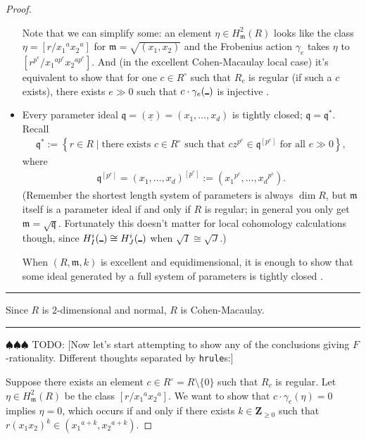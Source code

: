 \documentclass{amsart}
\theoremstyle{definition}
\def\ux{\underline{x}}
\def\Arg{\rule{1ex}{1pt}}
\def\fm{\mathfrak{m}}
\def\fq{\mathfrak{q}}
\newcommand{\ZZ}{\mathbf Z}
\newcommand{\todo}[1]{{\color{teal} \sf $\spadesuit\spadesuit\spadesuit$ TODO: [#1]}}
\begin{document}
\begin{proof}
\begin{itemize}
Note that we can simplify some: an element $\eta\in H_{\fm}^{2}(R)$ looks like the class $\eta=[r/{x_{1}}^{a}{x_{2}}^{a}]$ for $\fm=\sqrt{(x_{1},x_{2})}$ and the Frobenius action $\gamma_{e}$ takes $\eta$ to $[r^{p^{e}}/{x_{1}}^{ap^{e}}{x_{2}}^{ap^{e}}]$. And (in the excellent Cohen-Macaulay local case) it's equivalent to show that for one $c\in R^{\circ}$ such that $R_{c}$ is regular (if such a $c$ exists), there exists $e\gg0$ such that $c\cdot\gamma_{e}(\Arg)$ is injective \cite[Thm.\ ~7.9]{MP21}.
\item Every parameter ideal $\fq=(\ux)=(x_{1},\ldots,x_{d})$ is tightly closed; $\fq=\fq^{*}$. Recall 
\begin{align*}
\fq^{*}:=\left\{r\in R\mid\text{there exists }c\in R^{\circ}\text{ such that }cz^{p^{e}}\in\fq^{[p^{e}]}\text{ for all }e\gg0\right\},
\end{align*}
where
\begin{align*}
\fq^{[p^{e}]}=(x_{1},\ldots,x_{d})^{[p^{e}]}:=({x_{1}}^{p^{e}},\ldots,{x_{d}}^{p^{e}}).
\end{align*} 
(Remember the shortest length system of parameters is always $\dim R$, but $\fm$ itself is a parameter ideal if and only if $R$ is regular; in general you only get $\fm=\sqrt{\fq}$. Fortunately this doesn't matter for local cohomology calculations though, since $H_{I}^{i}(\Arg)\cong H_{J}^{i}(\Arg)$ when $\sqrt{I}\cong\sqrt{J}$.)

When $(R,\fm,k)$ is excellent and equidimensional, it is enough to show that some ideal generated by a full system of parameters is tightly closed \cite[(6.27) Prop.]{HH94}.
\end{itemize}

\bigbreak\hrule\bigbreak

Since $R$ is $2$-dimensional and normal, $R$ is Cohen-Macaulay. \checkmark

\bigbreak\hrule\bigbreak

\todo{Now let's start attempting to show any of the conclusions giving $F$-rationality. Different thoughts separated by \texttt{\symbol{`\\}hrule}s:}

Suppose there exists an element $c\in R^{\circ}=R\setminus\{0\}$ such that $R_{c}$ is regular. Let $\eta\in H_{\fm}^{2}(R)$ be the class $[r/{x_{1}}^{a}{x_{2}}^{a}]$. We want to show that $c\cdot\gamma_{e}(\eta)=0$ implies $\eta=0$, which occurs if and only if there exists $k\in\ZZ_{\geq0}$ such that $r(x_{1}x_{2})^{k}\in({x_{1}}^{a+k},{x_{2}}^{a+k})$. 


\end{proof}
\end{document}
